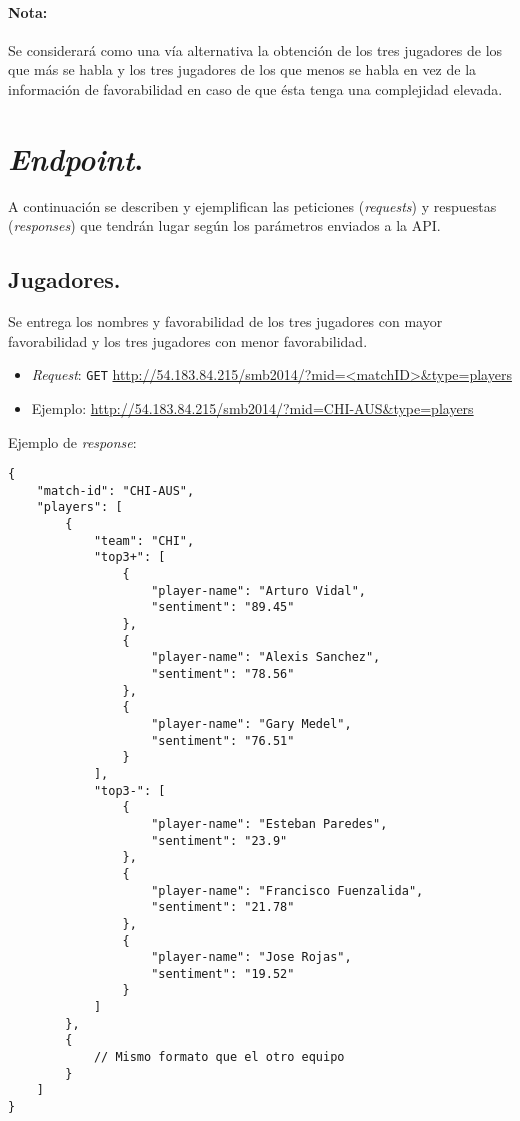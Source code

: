 \documentclass[11pt,spanish]{article}
\begin{document}
\paragraph{Nota:} Se considerará como una vía alternativa la obtención de los tres jugadores de los que más se habla y los tres jugadores de los que menos se habla en vez de la información de favorabilidad en caso de que ésta tenga una complejidad elevada.


\section{\emph{Endpoint}.}
A continuación se describen y ejemplifican las peticiones (\emph{requests}) y respuestas (\emph{responses}) que tendrán lugar según los parámetros enviados a la API.

\subsection{Jugadores.}
Se entrega los nombres y favorabilidad de los tres jugadores con mayor favorabilidad y los tres jugadores con menor favorabilidad.
\begin{itemize}
\item \emph{Request}: \texttt{GET} \url{http://54.183.84.215/smb2014/?mid=<matchID>&type=players}
\item Ejemplo: \url{http://54.183.84.215/smb2014/?mid=CHI-AUS&type=players}
\end{itemize}

Ejemplo de \emph{response}:
\begin{lstlisting}
{
    "match-id": "CHI-AUS",
    "players": [
        {
            "team": "CHI",
            "top3+": [
                {
                    "player-name": "Arturo Vidal",
                    "sentiment": "89.45"
                },
                {
                    "player-name": "Alexis Sanchez",
                    "sentiment": "78.56"
                },
                {
                    "player-name": "Gary Medel",
                    "sentiment": "76.51"
                }
            ],
            "top3-": [
                {
                    "player-name": "Esteban Paredes",
                    "sentiment": "23.9"
                },
                {
                    "player-name": "Francisco Fuenzalida",
                    "sentiment": "21.78"
                },
                {
                    "player-name": "Jose Rojas",
                    "sentiment": "19.52"
                }
            ]
        },
        {
            // Mismo formato que el otro equipo
        }
    ]
}
\end{lstlisting}
\end{document}
